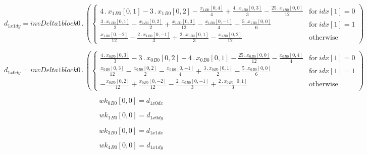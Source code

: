 \documentclass{article}
\begin{document}
\begin{dmath}d_{1 x1 dy} = invDelta1block0 \,.\, \left(\begin{cases} 4 \,.\, {x_{1}{_{B0}}}[{0,1}] - 3 \,.\, {x_{1}{_{B0}}}[{0,2}] - \frac{{x_{1}{_{B0}}}[{0,4}]}{4} + \frac{4 \,.\, {x_{1}{_{B0}}}[{0,3}]}{3} - \frac{25 \,.\, {x_{1}{_{B0}}}[{0,0}]}{12} 
& \text{for}\: {idx}[{1}] = 0 \\\frac{3 \,.\, {x_{1}{_{B0}}}[{0,1}]}{2} - \frac{{x_{1}{_{B0}}}[{0,2}]}{2} + \frac{{x_{1}{_{B0}}}[{0,3}]}{12} - \frac{{x_{1}{_{B0}}}[{0,-1}]}{4} - \frac{5 \,.\, {x_{1}{_{B0}}}[{0,0}]}{6} & \text{for}\: {idx}[{1}] = 1 
\\\frac{{x_{1}{_{B0}}}[{0,-2}]}{12} - \frac{2 \,.\, {x_{1}{_{B0}}}[{0,-1}]}{3} + \frac{2 \,.\, {x_{1}{_{B0}}}[{0,1}]}{3} - \frac{{x_{1}{_{B0}}}[{0,2}]}{12} & \text{otherwise} \end{cases}\right)\end{dmath}

\begin{dmath}d_{1 x0 dy} = invDelta1block0 \,.\, \left(\begin{cases} \frac{4 \,.\, {x_{0}{_{B0}}}[{0,3}]}{3} - 3 \,.\, {x_{0}{_{B0}}}[{0,2}] + 4 \,.\, {x_{0}{_{B0}}}[{0,1}] - \frac{25 \,.\, {x_{0}{_{B0}}}[{0,0}]}{12} - \frac{{x_{0}{_{B0}}}[{0,4}]}{4} 
& \text{for}\: {idx}[{1}] = 0 \\\frac{{x_{0}{_{B0}}}[{0,3}]}{12} - \frac{{x_{0}{_{B0}}}[{0,2}]}{2} - \frac{{x_{0}{_{B0}}}[{0,-1}]}{4} + \frac{3 \,.\, {x_{0}{_{B0}}}[{0,1}]}{2} - \frac{5 \,.\, {x_{0}{_{B0}}}[{0,0}]}{6} & \text{for}\: {idx}[{1}] = 1 
\\- \frac{{x_{0}{_{B0}}}[{0,2}]}{12} + \frac{{x_{0}{_{B0}}}[{0,-2}]}{12} - \frac{2 \,.\, {x_{0}{_{B0}}}[{0,-1}]}{3} + \frac{2 \,.\, {x_{0}{_{B0}}}[{0,1}]}{3} & \text{otherwise} \end{cases}\right)\end{dmath}

\begin{dmath}{wk_{0}{_{B0}}}[{0,0}] = d_{1 x0 dx}\end{dmath}

\begin{dmath}{wk_{1}{_{B0}}}[{0,0}] = d_{1 x0 dy}\end{dmath}

\begin{dmath}{wk_{3}{_{B0}}}[{0,0}] = d_{1 x1 dx}\end{dmath}

\begin{dmath}{wk_{4}{_{B0}}}[{0,0}] = d_{1 x1 dy}\end{dmath}
\end{document}
